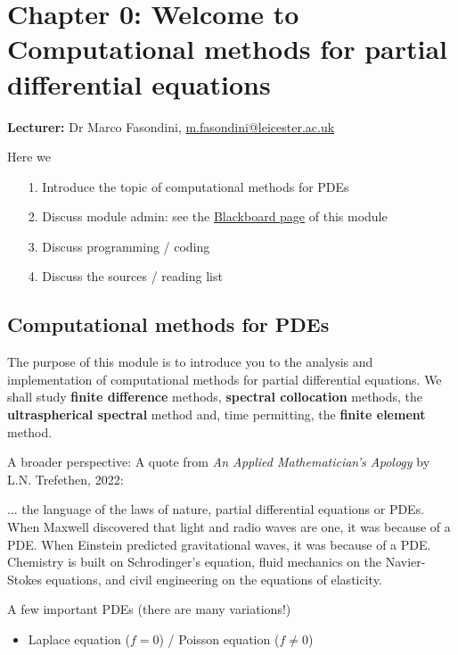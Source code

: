 \documentclass[12pt,landscape]{article}
\begin{document}
{\Huge
\sf
\section{Chapter 0: Welcome to Computational methods for partial differential equations}
\textbf{Lecturer:} Dr Marco Fasondini, \href{mailto:m.fasondini@leicester.ac.uk}{m.fasondini@leicester.ac.uk}

Here we

\begin{itemize}
\item[1. ] Introduce the topic of computational methods for PDEs


\item[2. ] Discuss module admin: see the \href{https://blackboard.le.ac.uk/}{Blackboard page} of this module


\item[3. ] Discuss programming / coding 


\item[4. ] Discuss the sources / reading list

\end{itemize}
\subsection{Computational methods for PDEs}
The purpose of this module is to introduce you to the analysis and implementation of computational methods for partial differential equations.  We shall study \textbf{finite difference} methods, \textbf{spectral collocation} methods, the \textbf{ultraspherical spectral} method and, time permitting, the \textbf{finite element} method.  

A broader perspective: A quote from \emph{An Applied Mathematician's Apology} by L.N. Trefethen, 2022:

... the language of the laws of nature, partial differential equations or PDEs. When Maxwell discovered that light and radio waves are one, it was because of a PDE. When Einstein predicted gravitational waves, it was because     of a PDE. Chemistry is built on Schrodinger's equation, fluid mechanics on the Navier-Stokes equations, and civil engineering on the equations of elasticity.

A few important PDEs (there are many variations!)

\begin{itemize}
\item Laplace equation ($f = 0$) / Poisson equation ($f \neq 0$) 


\end{itemize}}
\end{document}
